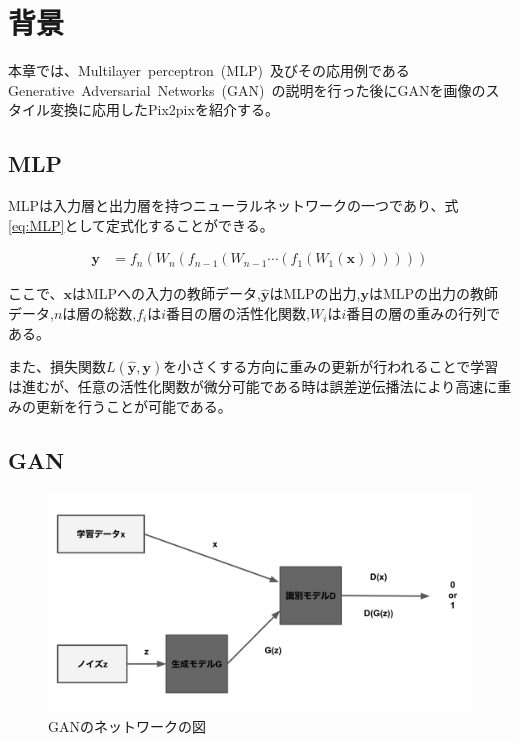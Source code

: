 
\chapter{背景}

本章では、Multilayer~perceptron~(MLP)~及びその応用例であるGenerative~Adversarial~Networks~(GAN)~の説明を行った後にGANを画像のスタイル変換に応用したPix2pixを紹介する。

\section{MLP}

MLPは入力層と出力層を持つニューラルネットワークの一つであり、式\ref{eq:MLP}として定式化することができる。

\begin{align}
    \label{eq:MLP}
    \boldsymbol{y}&=f_{n}(W_{n}(f_{n-1}(W_{n-1}\cdots(f_{1}(W_{1}(\boldsymbol{x}))))))
\end{align}

ここで、$\boldsymbol{x}$はMLPへの入力の教師データ,$\hat{\boldsymbol{y}}$はMLPの出力,$\boldsymbol{y}$はMLPの出力の教師データ,$n$は層の総数,$f_{i}$は$i$番目の層の活性化関数,$W_{i}$は$i$番目の層の重みの行列である。

また、損失関数$L(\hat{\boldsymbol{y}},\boldsymbol{y})$を小さくする方向に重みの更新が行われることで学習は進むが、任意の活性化関数が微分可能である時は誤差逆伝播法により高速に重みの更新を行うことが可能である。

\section{GAN}

\begin{figure}[t]
\begin{center}
\includegraphics[width=\hsize]{figure/GAN_net.png}
\caption{GANのネットワークの図}
\label{fig:GAN_net}
\end{center}
\end{figure}


